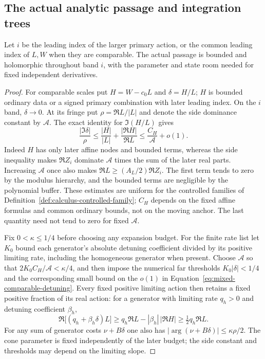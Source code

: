 \subsection{The actual analytic passage and integration trees}

\begin{lemma}\label{lem:mixed-actual}
Let $i$ be the leading index of the larger primary action, or the
common leading index of $L,W$ when they are comparable. The actual
passage is bounded and holomorphic throughout band $i$, with the
parameter and state room
needed for fixed independent derivatives.
\end{lemma}

\begin{proof}
For comparable scales put $H=W-c_0L$ and $\delta=H/L$; $H$ is
bounded ordinary data or a signed primary combination with later
leading index. On the $i$ band, $\delta\to0$. At its fringe put
$\rho=\Re L/|L|$ and denote the side dominance constant by
$\mathcal A$. The exact identity for $\Im(H/L)$ gives
\begin{equation}\label{eq:mixed-comparable-detuning}
 \frac{|\Im\delta|}{\rho}
 \leq\frac{|H|}{|L|}+\frac{|\Re H|}{\Re L}
 \leq\frac{C_H}{\mathcal A}+o(1).
\end{equation}
Indeed $H$ has only later affine nodes and bounded terms, whereas
the side inequality makes $\Re Z_i$ dominate $\mathcal A$ times
the sum of the later real parts. Increasing $\mathcal A$ once
also makes $\Re L\geq (A_L/2)\Re Z_i$. The first term tends
to zero by the modulus hierarchy, and the bounded terms are
negligible by the polynomial buffer. These estimates are uniform
for the controlled families of
Definition~\ref{def:calculus-controlled-family}; $C_H$ depends on
the fixed affine formulas and common ordinary bounds, not on the
moving anchor. The last quantity need not tend to zero for fixed
$\mathcal A$.

Fix $0<\kappa\leq1/4$ before choosing any expansion budget.
For the finite rate list let $K_0$ bound each generator's absolute
detuning coefficient divided by its positive limiting rate,
including the homogeneous generator when present. Choose
$\mathcal A$ so that $2K_0C_H/\mathcal A<\kappa/4$, and then
impose the numerical far thresholds
$K_0|\delta|<1/4$ and the corresponding small bound on the
$o(1)$ in Equation~\eqref{eq:mixed-comparable-detuning}.
Every fixed positive limiting action then retains a fixed
positive fraction of its real action: for a generator with
limiting rate $q_h>0$ and detuning coefficient $\beta_h$,
\[
 \Re\bigl[(q_h+\beta_h\delta)L\bigr]
 \geq q_h\Re L-|\beta_h|\,|\Re H|
 \geq \tfrac12 q_h\Re L.
\]
For any sum of generator
costs $\nu+B\delta$ one also has
$|\arg(\nu+B\delta)|\leq\kappa\rho/2$.
The cone parameter is fixed independently of the later budget;
the side constant and thresholds may depend on the limiting slope.


\end{proof}
